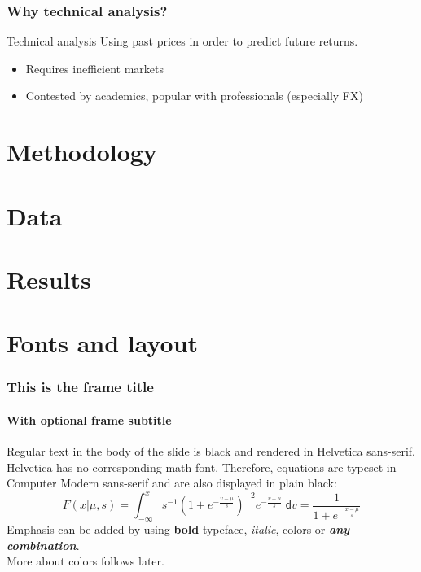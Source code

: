 \documentclass[aspectratio=169]{beamer}
\begin{document}
\begin{frame}
\frametitle{Why technical analysis?}
\begin{block}{Technical analysis}
	Using past prices in order to predict future returns. \\
	\begin{itemize}
		\item Requires inefficient markets
		\item Contested by academics, popular with professionals (especially FX)
	\end{itemize}
\end{block}



\end{frame}



\section{Methodology}
\section{Data}
\section{Results}

\section{Fonts and layout}

\begin{frame}
    \frametitle{This is the frame title}
    \framesubtitle{With optional frame subtitle}
    Regular text in the body of the slide is black and rendered in Helvetica sans-serif.\\[.5cm]
    Helvetica has no corresponding math font.
    Therefore, equations are typeset in Computer Modern sans-serif and are also displayed in plain black:
    \begin{equation*}
        F(x|\mu,s) = \int_{-\infty}^x s^{-1}\left(1+e^{-\frac{v-\mu}{s}}\right)^{-2} e^{-\frac{v-\mu}{s}}\;\mathsf{d}v = \frac{1}{1+e^{-\frac{x-\mu}{s}}}
    \end{equation*}
    Emphasis can be added by using \textbf{bold} typeface, \textit{italic}, {\color{ugent-alert}colors} or {\color{ugent-alert}\textbf{\textit{any combination}}}.\\
    More about colors follows later.
\end{frame}
\end{document}
